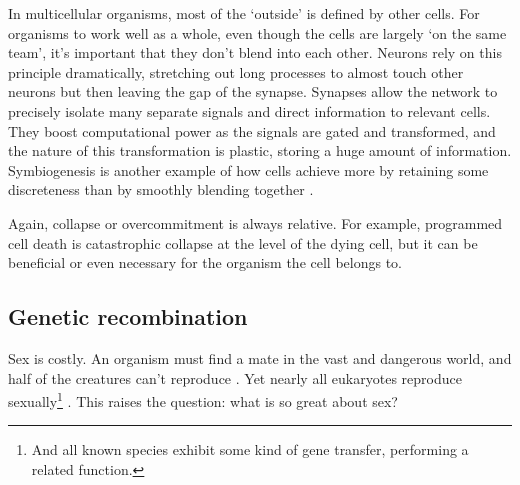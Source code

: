 \documentclass[12pt]{article}
\begin{document}
In multicellular organisms, most of the `outside' is defined by other cells. For organisms to work well as a whole, even though the cells are largely `on the same team', it's important that they don't blend into each other. Neurons rely on this principle dramatically, stretching out long processes to almost touch other neurons but then leaving the gap of the synapse. Synapses allow the network to precisely isolate many separate signals and direct information to relevant cells. They boost computational power as the signals are gated and transformed, and the nature of this transformation is plastic, storing a huge amount of information. Symbiogenesis is another example of how cells achieve more by retaining some discreteness than by smoothly blending together \citep{margulis1995what, margulis1986microcosmos}. 


Again, collapse or overcommitment is always relative. For example, programmed cell death is catastrophic collapse at the level of the dying cell, but it can be beneficial or even necessary for the organism the cell belongs to.


\subsection{Genetic recombination}


Sex is costly. An organism must find a mate in the vast and dangerous world, and half of the creatures can't reproduce \citep{smith1971origin, lehtonen2012many, smith1978evolution, goodenough2014origins}. Yet nearly all eukaryotes reproduce sexually\footnote{And all known species exhibit some kind of gene transfer, performing a related function.} \citep{speijer2015sex, bell1982masterpiece}. This raises the question: what is so great about sex?
\end{document}
